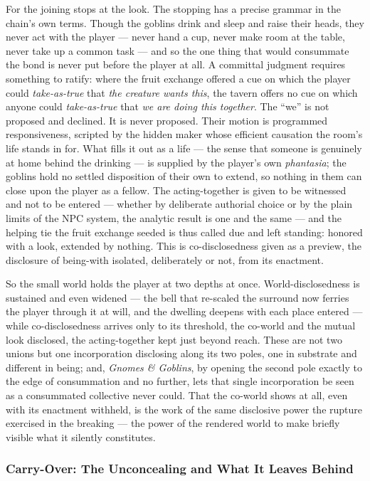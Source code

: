 \documentclass{article}
\begin{document}
For the joining stops at the look. The stopping has a precise grammar in the chain's own terms. Though the goblins drink and sleep and raise their heads, they never act with the player — never hand a cup, never make room at the table, never take up a common task — and so the one thing that would consummate the bond is never put before the player at all. A committal judgment requires something to ratify: where the fruit exchange offered a cue on which the player could \textit{take-as-true} that \textit{the creature wants this}, the tavern offers no cue on which anyone could \textit{take-as-true} that \textit{we are doing this together}. The ``we'' is not proposed and declined. It is never proposed. Their motion is programmed responsiveness, scripted by the hidden maker whose efficient causation the room's life stands in for. What fills it out as a life — the sense that someone is genuinely at home behind the drinking — is supplied by the player's own \textit{phantasia}; the goblins hold no settled disposition of their own to extend, so nothing in them can close upon the player as a fellow. The acting-together is given to be witnessed and not to be entered — whether by deliberate authorial choice or by the plain limits of the NPC system, the analytic result is one and the same — and the helping tie the fruit exchange seeded is thus called due and left standing: honored with a look, extended by nothing. This is co-disclosedness given as a preview, the disclosure of being-with isolated, deliberately or not, from its enactment.

So the small world holds the player at two depths at once. World-disclosedness is sustained and even widened — the bell that re-scaled the surround now ferries the player through it at will, and the dwelling deepens with each place entered — while co-disclosedness arrives only to its threshold, the co-world and the mutual look disclosed, the acting-together kept just beyond reach. These are not two unions but one incorporation disclosing along its two poles, one in substrate and different in being; and, \textit{Gnomes \& Goblins}, by opening the second pole exactly to the edge of consummation and no further, lets that single incorporation be seen as a consummated collective never could. That the co-world shows at all, even with its enactment withheld, is the work of the same disclosive power the rupture exercised in the breaking — the power of the rendered world to make briefly visible what it silently constitutes.

\subsubsection*{Carry-Over: The Unconcealing and What It Leaves Behind}
\end{document}
